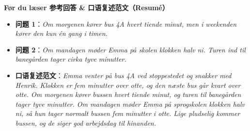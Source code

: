 \begin{answerbox}
\textbf{Før du læser 参考回答 \& 口语复述范文（Resumé）}
\begin{itemize}
  \item \textbf{问题 1}：\textit{Om morgenen kører bus 4A hvert tiende minut, men i weekenden kører den kun én gang i timen.}
  \item \textbf{问题 2}：\textit{Om mandagen møder Emma på skolen klokken halv ni. Turen ind til banegården tager cirka tyve minutter.}
  \item \textbf{口语复述范文}：\textit{Emma venter på bus 4A ved stoppestedet og snakker med Henrik. Klokken er fem minutter over otte, og den næste bus går kvart over otte. Om morgenen kører bussen hvert tiende minut, og turen til banegården tager tyve minutter. Om mandagen møder Emma på sprogskolen klokken halv ni, så hun tager normalt bussen fem minutter i otte. Lige pludselig kommer bussen, og de siger god arbejdsdag til hinanden.}
\end{itemize}
\end{answerbox}
